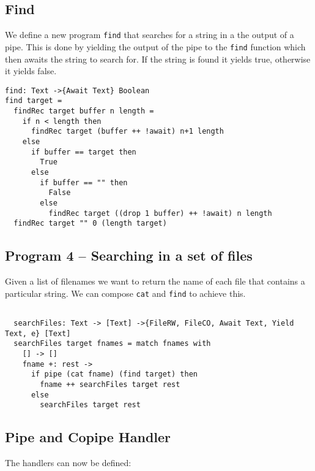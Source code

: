 \documentclass[logo,bsc,singlespacing,parskip]{infthesis}
\begin{document}
\subsection{Find}

We define a new program \texttt{find} that searches for a string in a the output of a pipe. This is done by yielding the output of the pipe to the \texttt{find} function which then awaits the string to search for. If the string is found it yields true, otherwise it yields false.

\begin{lstlisting}[language=unison]
find: Text ->{Await Text} Boolean 
find target = 
  findRec target buffer n length =
    if n < length then
      findRec target (buffer ++ !await) n+1 length
    else 
      if buffer == target then
        True
      else 
        if buffer == "" then
          False
        else 
          findRec target ((drop 1 buffer) ++ !await) n length
  findRec target "" 0 (length target)

\end{lstlisting}

\begin{tcolorbox}[colback=gray!10, colframe=black, arc=0pt, outer arc=0pt]
  \section*{Program 4 -- Searching in a set of files}
  
  Given a list of filenames we want to return the name of each file that
  contains a particular string. We can compose \texttt{cat} and \texttt{find}
  to achieve this.

  \begin{lstlisting}[language=unison]
  
  searchFiles: Text -> [Text] ->{FileRW, FileCO, Await Text, Yield Text, e} [Text]
  searchFiles target fnames = match fnames with 
    [] -> []
    fname +: rest -> 
      if pipe (cat fname) (find target) then
        fname ++ searchFiles target rest
      else
        searchFiles target rest

  \end{lstlisting}
\end{tcolorbox}

\subsection{Pipe and Copipe Handler}

The handlers can now be defined:
\end{document}
